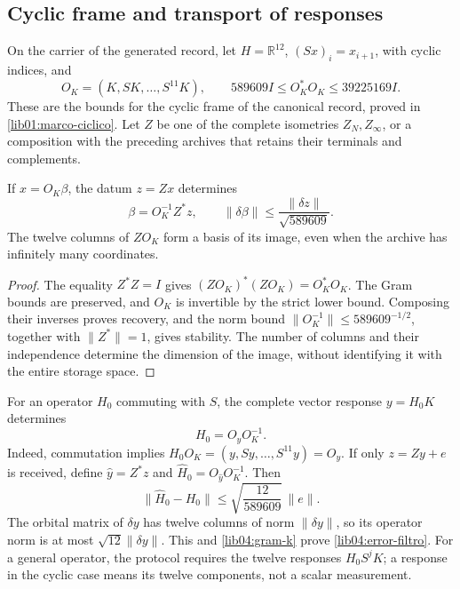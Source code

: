 \subsection{Cyclic frame and transport of responses}
\label{lib04:marco}

On the carrier of the generated record, let
\(H=\mathbb R^{12}\), \((Sx)_i=x_{i+1}\), with cyclic indices,
and
\begin{equation}
 O_K=(K,SK,\ldots,S^{11}K),\qquad
 589609I\leq O_K^*O_K\leq39225169I.
 \label{lib04:gram-k}
\end{equation}
These are the bounds for the cyclic frame of the canonical record,
proved in \cref{lib01:marco-ciclico}.
Let \(Z\) be one of the complete isometries
\(Z_N,Z_\infty\), or a composition with the preceding archives
that retains their terminals and complements.

\begin{theorem}
\label{lib04:teo-marco}
If \(x=O_K\beta\), the datum \(z=Zx\) determines
\begin{equation}
 \beta=O_K^{-1}Z^*z,\qquad
 \|\delta\beta\|\leq\frac{\|\delta z\|}{\sqrt{589609}}.
 \label{lib04:inversa-marco}
\end{equation}
The twelve columns of \(ZO_K\) form a basis of its image, even
when the archive has infinitely many coordinates.
\end{theorem}

\begin{proof}
The equality \(Z^*Z=I\) gives
\((ZO_K)^*(ZO_K)=O_K^*O_K\). The Gram bounds are preserved, and
\(O_K\) is invertible by the strict lower bound. Composing their
inverses proves recovery, and the norm bound
\(\|O_K^{-1}\|\leq589609^{-1/2}\), together with
\(\|Z^*\|=1\), gives stability. The number of columns and their
independence determine the dimension of the image, without identifying it
with the entire storage space.
\end{proof}

For an operator \(H_0\) commuting with \(S\), the complete vector
response \(y=H_0K\) determines
\begin{equation}
 H_0=O_yO_K^{-1}.
 \label{lib04:identificacion-filtro}
\end{equation}
Indeed, commutation implies
\(H_0O_K=(y,Sy,\ldots,S^{11}y)=O_y\). If only
\(z=Zy+e\) is received, define \(\widehat y=Z^*z\) and
\(\widehat H_0=O_{\widehat y}O_K^{-1}\). Then
\begin{equation}
 \|\widehat H_0-H_0\|
 \leq\sqrt{\frac{12}{589609}}\,\|e\|.
 \label{lib04:error-filtro}
\end{equation}
The orbital matrix of \(\delta y\) has twelve columns of norm
\(\|\delta y\|\), so its operator norm is at most
\(\sqrt{12}\|\delta y\|\). This and
\eqref{lib04:gram-k} prove \eqref{lib04:error-filtro}.
For a general operator, the protocol requires the twelve responses
\(H_0S^jK\); a response in the cyclic case means its twelve
components, not a scalar measurement.

